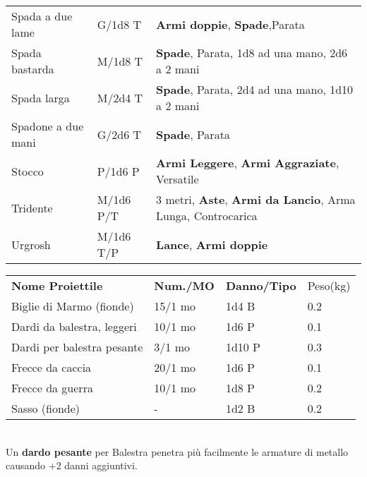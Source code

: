 \documentclass[landscape,10pt,a4paper]{article}
\begin{document}
\begin{multicols}{2}
\begin{dmbox}[title=Armi - pagina \pageref{equipaggiamentoarmi}]
{\begin{tabularx}{1\linewidth}{lll}
Spada a due lame& G/1d8 T& \textbf{Armi doppie}, \textbf{Spade},Parata\\
Spada bastarda& M/1d8 T&\textbf{Spade}, Parata, 1d8 ad una mano, 2d6 a 2 mani\\
Spada larga& M/2d4 T&\textbf{Spade}, Parata, 2d4 ad una mano, 1d10 a 2 mani\\
Spadone a due mani& G/2d6 T&\textbf{Spade}, Parata\\
Stocco& P/1d6 P& \textbf{Armi Leggere}, \textbf{Armi Aggraziate}, Versatile\\
Tridente& M/1d6 P/T& 3 metri, \textbf{Aste}, \textbf{Armi da Lancio}, Arma Lunga, Controcarica\\
Urgrosh& M/1d6 T/P& \textbf{Lance}, \textbf{Armi doppie}
\end{tabularx}}
\end{dmbox}


\begin{dmbox}[title=Proiettili - pagina \pageref{proiettili}]

\begin{tabular}{llll}
\textbf{Nome Proiettile}   & \textbf{Num./MO} & \textbf{Danno/Tipo} & Peso(kg) \\
Biglie di Marmo (fionde)   & 15/1 mo                    & 1d4 B               & 0.2      \\
Dardi da balestra, leggeri & 10/1 mo                    & 1d6 P               & 0.1      \\
Dardi per balestra pesante & 3/1 mo                     & 1d10 P              & 0.3      \\
Frecce da caccia           & 20/1 mo                    & 1d6 P               & 0.1      \\
Frecce da guerra           & 10/1 mo                    & 1d8 P               & 0.2      \\
Sasso (fionde)             & -                          & 1d2 B               & 0.2      \\
\end{tabular}\\

Un \textbf{dardo pesante} per Balestra penetra più facilmente le armature di metallo causando +2 danni aggiuntivi.

\end{dmbox}


\begin{dmbox}[title=Armature - pagina \pageref{equipaggiamentoarmature}]


\end{dmbox}
\end{multicols}
\end{document}
